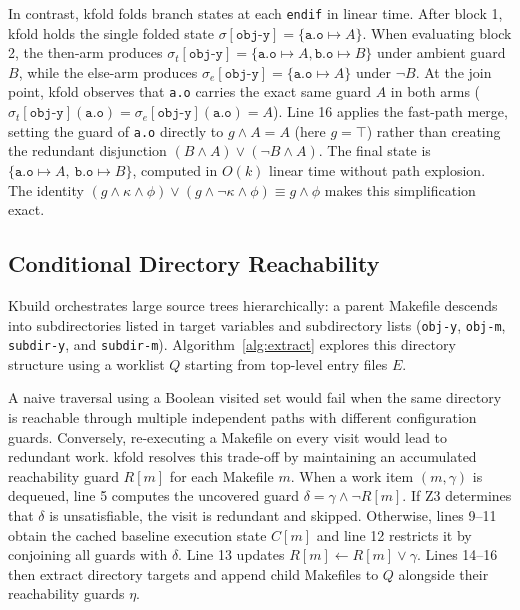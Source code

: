 \documentclass[acmsmall]{acmart}
\newcommand{\tool}{\textsf{kfold}\xspace}
\begin{document}
In contrast, \tool folds branch states at each \texttt{endif} in linear time.
After block 1, \tool holds the single folded state $\sigma[\texttt{obj-y}] = \{\texttt{a.o} \mapsto A\}$.
When evaluating block 2, the then-arm produces $\sigma_t[\texttt{obj-y}] = \{\texttt{a.o} \mapsto A, \texttt{b.o} \mapsto B\}$ under ambient guard $B$, while the else-arm produces $\sigma_e[\texttt{obj-y}] = \{\texttt{a.o} \mapsto A\}$ under $\neg B$.
At the join point, \tool observes that \texttt{a.o} carries the exact same guard $A$ in both arms ($\sigma_t[\texttt{obj-y}](\texttt{a.o}) = \sigma_e[\texttt{obj-y}](\texttt{a.o}) = A$).
Line 16 applies the fast-path merge, setting the guard of \texttt{a.o} directly to $g \land A = A$ (here $g = \top$) rather than creating the redundant disjunction $(B \land A) \lor (\neg B \land A)$.
The final state is $\{\texttt{a.o} \mapsto A,\ \texttt{b.o} \mapsto B\}$, computed in $O(k)$ linear time without path explosion.
The identity $(g \land \kappa \land \phi) \lor (g \land \neg\kappa \land \phi) \equiv g \land \phi$ makes this simplification exact.

\subsection{Conditional Directory Reachability}\label{sec:technique:worklist}

Kbuild orchestrates large source trees hierarchically: a parent Makefile descends into subdirectories listed in target variables and subdirectory lists (\texttt{obj-y}, \texttt{obj-m}, \texttt{subdir-y}, and \texttt{subdir-m}).
Algorithm~\ref{alg:extract} explores this directory structure using a worklist $Q$ starting from top-level entry files $E$.

A naive traversal using a Boolean visited set would fail when the same directory is reachable through multiple independent paths with different configuration guards.
Conversely, re-executing a Makefile on every visit would lead to redundant work.
\tool resolves this trade-off by maintaining an accumulated reachability guard $R[m]$ for each Makefile $m$.
When a work item $(m, \gamma)$ is dequeued, line 5 computes the uncovered guard $\delta = \gamma \land \neg R[m]$.
If Z3 determines that $\delta$ is unsatisfiable, the visit is redundant and skipped.
Otherwise, lines 9--11 obtain the cached baseline execution state $C[m]$ and line 12 restricts it by conjoining all guards with $\delta$.
Line 13 updates $R[m] \gets R[m] \lor \gamma$.
Lines 14--16 then extract directory targets and append child Makefiles to $Q$ alongside their reachability guards $\eta$.
\end{document}
